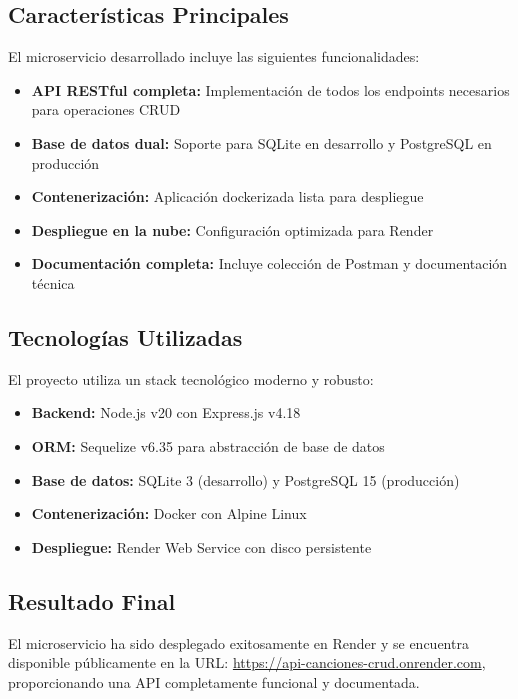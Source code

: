 \documentclass[12pt,a4paper]{article}
\begin{document}
\subsection{Características Principales}

El microservicio desarrollado incluye las siguientes funcionalidades:

\begin{itemize}
    \item \textbf{API RESTful completa:} Implementación de todos los endpoints necesarios para operaciones CRUD
    \item \textbf{Base de datos dual:} Soporte para SQLite en desarrollo y PostgreSQL en producción
    \item \textbf{Contenerización:} Aplicación dockerizada lista para despliegue
    \item \textbf{Despliegue en la nube:} Configuración optimizada para Render
    \item \textbf{Documentación completa:} Incluye colección de Postman y documentación técnica
\end{itemize}

\subsection{Tecnologías Utilizadas}

El proyecto utiliza un stack tecnológico moderno y robusto:

\begin{itemize}
    \item \textbf{Backend:} Node.js v20 con Express.js v4.18
    \item \textbf{ORM:} Sequelize v6.35 para abstracción de base de datos
    \item \textbf{Base de datos:} SQLite 3 (desarrollo) y PostgreSQL 15 (producción)
    \item \textbf{Contenerización:} Docker con Alpine Linux
    \item \textbf{Despliegue:} Render Web Service con disco persistente
\end{itemize}

\subsection{Resultado Final}

El microservicio ha sido desplegado exitosamente en Render y se encuentra disponible públicamente en la URL: \url{https://api-canciones-crud.onrender.com}, proporcionando una API completamente funcional y documentada.
\end{document}
